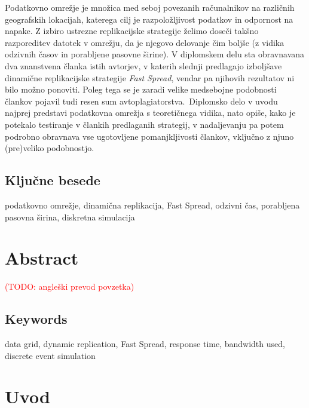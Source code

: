 \documentclass[a4paper, 12pt]{book}
\newcommand{\TODO}[1]{\textcolor{red}{(TODO: #1)}}
\newcommand{\clearemptydoublepage}{
	\newpage{\pagestyle{empty}\cleardoublepage}}
\begin{document}
Podatkovno omrežje je množica med seboj povezanih računalnikov na raz\-ličnih
geografskih lokacijah, katerega cilj je razpoložljivost podatkov in odpor\-nost
na napake. Z izbiro ustrezne replikacijske strategije želimo doseči takšno
razporeditev datotek v omrežju, da je njegovo delovanje čim boljše (z
\mbox{vidika} odzivnih časov in porabljene pasovne širine). V diplomskem delu
sta obravnavana dva znanstvena članka istih avtorjev, v katerih slednji
predlagajo izboljšave dinamične replikacijske strategije \textit{Fast Spread},
vendar pa njihovih rezultatov ni bilo možno ponoviti. Poleg tega se je zaradi
velike medsebojne podobnosti člankov pojavil tudi resen sum avtoplagiatorstva.\
Diplomsko delo v uvodu najprej predstavi podatkovna omrežja s teoretičnega
vidika, nato opiše, kako je potekalo testiranje v člankih predlaganih
strategij, v nadaljevanju pa potem podrobno obravnava vse ugotovljene
pomanjkljivosti člankov, vključno z njuno (pre)veliko podobnostjo.

\section*{Ključne besede}
podatkovno omrežje, dinamična replikacija, Fast Spread, odzivni čas,
porabljena pasovna širina, diskretna simulacija


\clearemptydoublepage


\chapter*{Abstract}

\TODO{angleški prevod povzetka}

\section*{Keywords}
data grid, dynamic replication, Fast Spread, response time, bandwidth used,
discrete event simulation


\clearemptydoublepage


\mainmatter
\setcounter{page}{1}
\pagestyle{fancy}

\chapter{Uvod}
\end{document}
